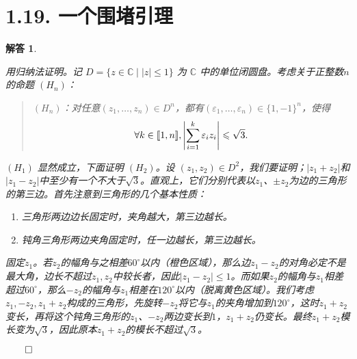 \documentclass[12pt,UTF8]{ctexbook}
\theoremstyle{exercisestyle}
\theoremstyle{solutionstyle}
\newtheorem*{solution*}{解答}
\newenvironment{solution}
  {\begin{solution*}}
  {\hfill\ensuremath{\qed}\end{solution*}}
\begin{document}
\section{1.19. 一个围堵引理}
\begin{solution}
\begin{subquestions}
\item 用归纳法证明。记 \( D = \{z \in \mathbb{C} \mid |z| \leqslant 1\} \) 为 \( \mathbb{C} \) 中的单位闭圆盘。考虑关于正整数$n$的命题 \( (H_n) \)：
\begin{quotation}
  $(H_n) $：对任意$(z_1, \ldots, z_n) \in D^n$，都有$(\varepsilon_1, \ldots, \varepsilon_n) \in \{1, -1\}^n$，使得
  $$ \forall k \in [\![1,n]\!], \left| \sum_{i=1}^k \varepsilon_i z_i \right| \leqslant \sqrt{3}. $$
\end{quotation}

\( (H_1) \) 显然成立，下面证明 \( (H_2) \)。设 \( (z_1, z_2) \in D^2 \)，我们要证明；$|z_1 + z_2|$和$|z_1 - z_2|$中至少有一个不大于$\sqrt{3}$。直观上，它们分别代表以$z_1$、$\pm z_2$为边的三角形的第三边。首先注意到三角形的几个基本性质：
\begin{enumerate}[label=\arabic*.]
  \item 三角形两边边长固定时，夹角越大，第三边越长。
  \item 钝角三角形两边夹角固定时，任一边越长，第三边越长。
\end{enumerate}
固定$z_1$。若$z_2$的幅角与之相差$60^\circ$以内（橙色区域），那么边$z_1 - z_2$的对角必定不是最大角，边长不超过$z_1,z_2$中较长者，因此$|z_1 - z_2| \leqslant 1$。而如果$z_2$的幅角与$z_1$相差超过$60^\circ$，那么$-z_2$的幅角与$z_1$相差在$120^\circ$以内（脱离黄色区域）。我们考虑$z_1, -z_2, z_1 + z_2$构成的三角形，先旋转$-z_2$将它与$z_1$的夹角增加到$120^\circ$，这时$z_1+z_2$变长，再将这个钝角三角形的$z_1$、$-z_2$两边变长到$1$，$z_1+z_2$仍变长。最终$z_1+z_2$模长变为$\sqrt{3}$，因此原本$z_1 + z_2$的模长不超过$\sqrt{3}$。

\begin{minipage}[t]{0.4\textwidth}
\centering
\end{minipage}
\end{subquestions}
\end{solution}
\end{document}

